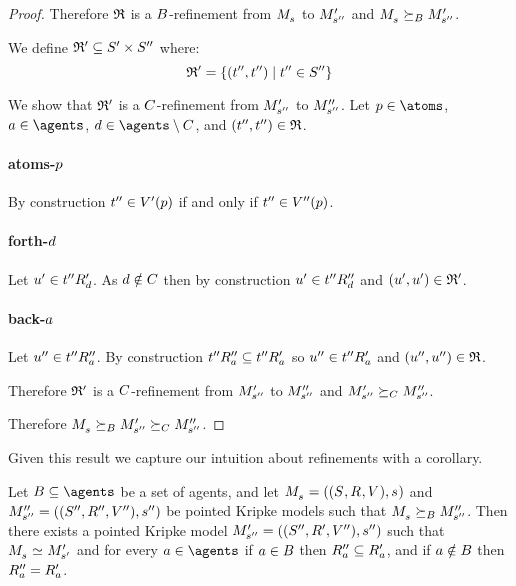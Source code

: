 \begin{proof}
Therefore $\mathfrak{R}$ is a $B$-refinement from $\kPModel{\kStateS}$ to ${M^{\prime}_{{s}^{\prime\prime}}}$ and $\kPModel{\kStateS} \simulatesBs \kPModelP{\kStateSPP}$.

We define $\mathfrak{R}' \subseteq {S^{\prime}} \times {S^{\prime\prime}}$ where:
$$
\mathfrak{R}' = \{({t}^{\prime\prime}, {t}^{\prime\prime}) \mid {t}^{\prime\prime} \in {S^{\prime\prime}}\}
$$

We show that $\mathfrak{R}'$ is a $C$-refinement from ${M^{\prime}_{{s}^{\prime\prime}}}$ to ${M^{\prime\prime}_{{s}^{\prime\prime}}}$.
Let $\atomP \in \atoms$, $\agentA \in \agents$, $\agentD \in \agents \setminus \agentsC$, and $({t}^{\prime\prime}, {t}^{\prime\prime}) \in \mathfrak{R}$.

\paragraph{atoms-$p$}
By construction ${t}^{\prime\prime} \in {V^{\prime}}(p)$ if and only if ${t}^{\prime\prime} \in {V^{\prime\prime}}(p)$.

\paragraph{forth-$d$}
Let ${u}^{\prime} \in {{t}^{\prime\prime}} {R^{\prime}_{d}}$.
As $d \notin C$ then by construction ${u}^{\prime} \in {{t}^{\prime\prime}} {R^{\prime\prime}_{d}}$ and $({u}^{\prime}, {u}^{\prime}) \in \mathfrak{R}'$.

\paragraph{back-$a$}
Let ${u}^{\prime\prime} \in {{t}^{\prime\prime}} {R^{\prime\prime}_{a}}$.
By construction ${{t}^{\prime\prime}} {R^{\prime\prime}_{a}} \subseteq {{t}^{\prime\prime}} {R^{\prime}_{a}}$ so ${u}^{\prime\prime} \in {{t}^{\prime\prime}} {R^{\prime}_{a}}$ and $({u}^{\prime\prime}, {u}^{\prime\prime}) \in \mathfrak{R}$.

Therefore $\mathfrak{R}'$ is a $C$-refinement from ${M^{\prime}_{{s}^{\prime\prime}}}$ to ${M^{\prime\prime}_{{s}^{\prime\prime}}}$ and ${M^{\prime}_{{s}^{\prime\prime}}} \succeq_{C} {M^{\prime\prime}_{{s}^{\prime\prime}}}$.

Therefore $\kPModel{\kStateS} \simulatesBs \kPModelP{\kStateSPP} \simulatesCs \kPModelPP{\kStateSPP}$.
\end{proof}

Given this result we capture our intuition about refinements with a corollary.

\begin{corollary}\label{refinement-subrelations}
Let $\agentsB \subseteq \agents$ be a set of agents, and let $\kPModelAndTuple{\kStateS}$ and $\kPModelAndTuplePP{\kStateSPP}$ be pointed Kripke models such that $\kPModel{\kStateS} \simulatesBs \kPModelPP{\kStateSPP}$.
Then there exists a pointed Kripke model ${M^{\prime}_{{s}^{\prime\prime}}} = (({S^{\prime\prime}}, {R^{\prime}_{}}, {V^{\prime\prime}}), {s}^{\prime\prime})$ such that $\kPModel{\kStateS} \bisimilar \kPModelP{\kStateSP}$ and for every $\agentA \in \agents$ if $a \in B$ then ${R^{\prime\prime}_{a}} \subseteq {R^{\prime}_{a}}$, and if $a \notin B$ then ${R^{\prime\prime}_{a}} = {R^{\prime}_{a}}$.
\end{corollary}

